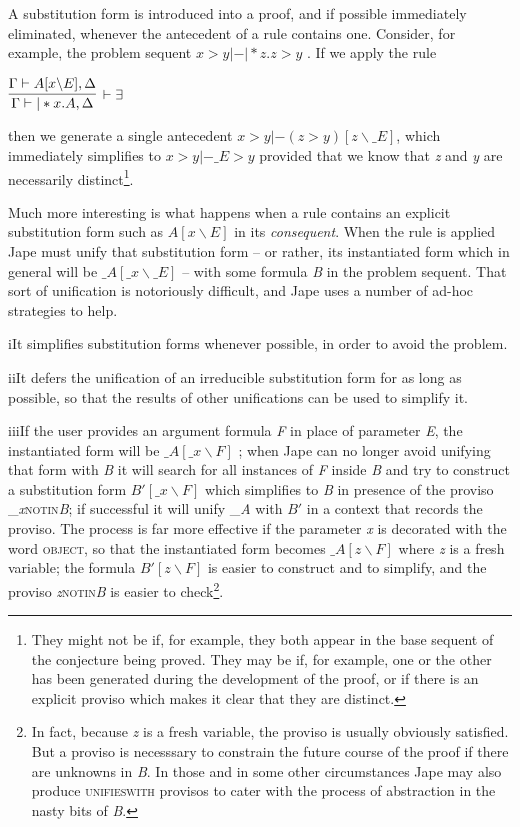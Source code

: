 \documentclass[11pt]{book}
\newcommand{\tab}{\hspace{5mm}}
\begin{document}
A substitution form is introduced into a proof, and if possible immediately eliminated, whenever the antecedent of a rule contains one. Consider, for example, the problem sequent $x>y |-|*z.z>y$ . If we apply the rule


$\infer[|-\exists] {\Gamma|-|*x.A,\Delta} {\Gamma|-A[x\backslash E],\Delta}$

then we generate a single antecedent $x>y |- (z>y)[z\backslash \_E]$, which immediately simplifies to $x>y |- \_E>y$ provided that we know that \textit{z} and \textit{y} are necessarily distinct\footnote{They might not be if, for example, they both appear in the base sequent of the conjecture being proved. They may be if, for example, one or the other has been generated during the development of the proof, or if there is an explicit proviso which makes it clear that they are distinct.}.


Much more interesting is what happens when a rule contains an explicit substitution form such as $A[x\backslash E]$ in its \textit{consequent}. When the rule is applied Jape must unify that substitution form -- or rather, its instantiated form which in general will be $\_{}A[\_{}x\backslash \_{}E]$ -- with some formula \textit{B} in the problem sequent. That sort of unification is notoriously difficult, and Jape uses a number of ad-hoc strategies to help.


i\tab It simplifies substitution forms whenever possible, in order to avoid the problem.


ii\tab It defers the unification of an irreducible substitution form for as long as possible, so that the results of other unifications can be used to simplify it.


iii\tab If the user provides an argument formula \textit{F} in place of parameter \textit{E}, the instantiated form will be $\_{}A[\_{}x\backslash F]$ ; when Jape can no longer avoid unifying that form with \textit{B} it will search for all instances of \textit{F} inside \textit{B} and try to construct a substitution form $B' [\_{}x\backslash F]$ which simplifies to \textit{B} in presence of the proviso \_\textit{x}{\nobreakspace}\textsc{notin{\nobreakspace}}\textit{\textsc{B}}; if successful it will unify \_\textit{A} with $B' $ in a context that records the proviso. The process is far more effective if the parameter \textit{x} is decorated with the word \textsc{object}, so that the instantiated form becomes $\_{}A[z\backslash F]$ where \textit{z} is a fresh variable; the formula $B' [z\backslash F]$ is easier to construct and to simplify, and the proviso \textit{z}{\nobreakspace}\textsc{notin}{\nobreakspace}\textit{B} is easier to check\footnote{In fact, because \textit{z} is a fresh variable, the proviso is usually obviously satisfied. But a proviso is necesssary to constrain the future course of the proof if there are unknowns in \textit{B}. In those and in some other circumstances Jape may also produce \textsc{unifieswith} provisos to cater with the process of abstraction in the nasty bits of \textit{B}.}.
\end{document}
